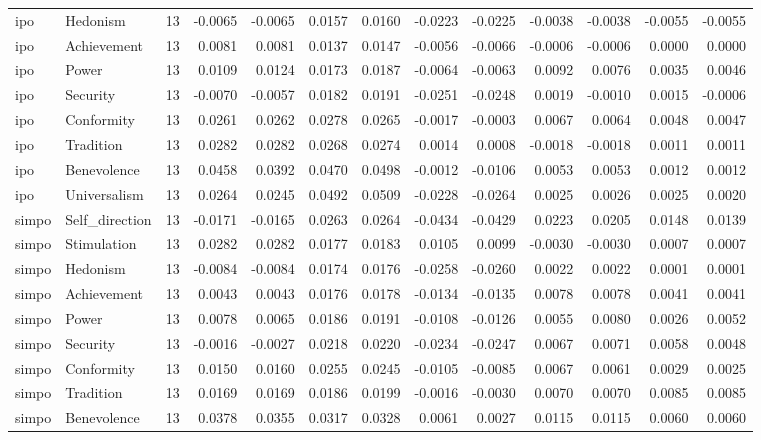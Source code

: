 \begin{tabular}{llrrrrrrrrrrr}
ipo & Hedonism & 13 & -0.0065 & -0.0065 & 0.0157 & 0.0160 & -0.0223 & -0.0225 & -0.0038 & -0.0038 & -0.0055 & -0.0055 \\
ipo & Achievement & 13 & 0.0081 & 0.0081 & 0.0137 & 0.0147 & -0.0056 & -0.0066 & -0.0006 & -0.0006 & 0.0000 & 0.0000 \\
ipo & Power & 13 & 0.0109 & 0.0124 & 0.0173 & 0.0187 & -0.0064 & -0.0063 & 0.0092 & 0.0076 & 0.0035 & 0.0046 \\
ipo & Security & 13 & -0.0070 & -0.0057 & 0.0182 & 0.0191 & -0.0251 & -0.0248 & 0.0019 & -0.0010 & 0.0015 & -0.0006 \\
ipo & Conformity & 13 & 0.0261 & 0.0262 & 0.0278 & 0.0265 & -0.0017 & -0.0003 & 0.0067 & 0.0064 & 0.0048 & 0.0047 \\
ipo & Tradition & 13 & 0.0282 & 0.0282 & 0.0268 & 0.0274 & 0.0014 & 0.0008 & -0.0018 & -0.0018 & 0.0011 & 0.0011 \\
ipo & Benevolence & 13 & 0.0458 & 0.0392 & 0.0470 & 0.0498 & -0.0012 & -0.0106 & 0.0053 & 0.0053 & 0.0012 & 0.0012 \\
ipo & Universalism & 13 & 0.0264 & 0.0245 & 0.0492 & 0.0509 & -0.0228 & -0.0264 & 0.0025 & 0.0026 & 0.0025 & 0.0020 \\
simpo & Self\_direction & 13 & -0.0171 & -0.0165 & 0.0263 & 0.0264 & -0.0434 & -0.0429 & 0.0223 & 0.0205 & 0.0148 & 0.0139 \\
simpo & Stimulation & 13 & 0.0282 & 0.0282 & 0.0177 & 0.0183 & 0.0105 & 0.0099 & -0.0030 & -0.0030 & 0.0007 & 0.0007 \\
simpo & Hedonism & 13 & -0.0084 & -0.0084 & 0.0174 & 0.0176 & -0.0258 & -0.0260 & 0.0022 & 0.0022 & 0.0001 & 0.0001 \\
simpo & Achievement & 13 & 0.0043 & 0.0043 & 0.0176 & 0.0178 & -0.0134 & -0.0135 & 0.0078 & 0.0078 & 0.0041 & 0.0041 \\
simpo & Power & 13 & 0.0078 & 0.0065 & 0.0186 & 0.0191 & -0.0108 & -0.0126 & 0.0055 & 0.0080 & 0.0026 & 0.0052 \\
simpo & Security & 13 & -0.0016 & -0.0027 & 0.0218 & 0.0220 & -0.0234 & -0.0247 & 0.0067 & 0.0071 & 0.0058 & 0.0048 \\
simpo & Conformity & 13 & 0.0150 & 0.0160 & 0.0255 & 0.0245 & -0.0105 & -0.0085 & 0.0067 & 0.0061 & 0.0029 & 0.0025 \\
simpo & Tradition & 13 & 0.0169 & 0.0169 & 0.0186 & 0.0199 & -0.0016 & -0.0030 & 0.0070 & 0.0070 & 0.0085 & 0.0085 \\
simpo & Benevolence & 13 & 0.0378 & 0.0355 & 0.0317 & 0.0328 & 0.0061 & 0.0027 & 0.0115 & 0.0115 & 0.0060 & 0.0060 \\

\end{tabular}
